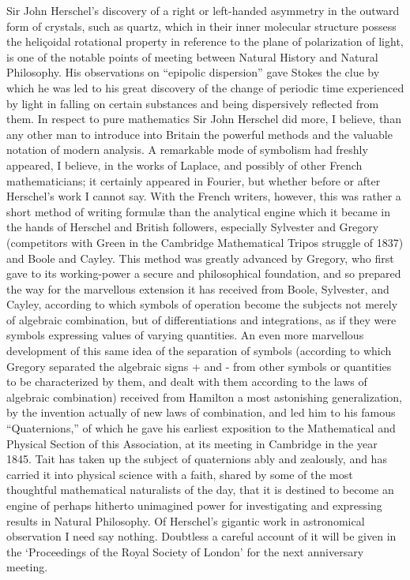 \documentclass[a4paper, 11pt, oneside, english]{article}
\begin{document}
Sir John Herschel's discovery of a right or left-handed asymmetry in the outward form of crystals, such as quartz, which in their inner molecular structure possess the heliçoidal rotational property in reference to the plane of polarization of light, is one of the notable points of meeting between Natural History and Natural Philosophy. His observations on ``epipolic dispersion'' gave Stokes the clue by which he was led to his great discovery of the change of periodic time experienced by light in falling on certain substances and being dispersively reflected from them. In respect to pure mathematics Sir John Herschel did more, I believe, than any other man to introduce into Britain the powerful methods and the valuable notation of modern analysis. A remarkable mode of symbolism had freshly appeared, I believe, in the works of Laplace, and possibly of other French mathematicians; it certainly appeared in Fourier, but whether before or after Herschel's work I cannot say. With the French writers, however, this was rather a short method of writing formulæ than the analytical engine which it became in the hands of Herschel and British followers, especially Sylvester and Gregory (competitors with Green in the Cambridge Mathematical Tripos struggle of 1837) and Boole and Cayley. This method was greatly advanced by Gregory, who first gave to its working-power a secure and philosophical foundation, and so prepared the way for the marvellous extension it has received from Boole, Sylvester, and Cayley, according to which symbols of operation become the subjects not merely of algebraic combination, but of differentiations and integrations, as if they were symbols expressing values of varying quantities. An even more marvellous development of this same idea of the separation of symbols (according to which Gregory separated the algebraic signs + and - from other symbols or quantities to be characterized by them, and dealt with them according to the laws of algebraic combination) received from Hamilton a most astonishing generalization, by the invention actually of new laws of combination, and led him to his famous ``Quaternions,'' of which he gave his earliest exposition to the Mathematical and Physical Section of this Association, at its meeting in Cambridge in the year 1845. Tait has taken up the subject of quaternions ably and zealously, and has carried it into physical science with a faith, shared by some of the most thoughtful mathematical naturalists of the day, that it is destined to become an engine of perhaps hitherto unimagined power for investigating and expressing results in Natural Philosophy. Of Herschel's gigantic work in astronomical observation I need say nothing. Doubtless a careful account of it will be given in the `Proceedings of the Royal Society of London' for the next anniversary meeting.
\end{document}
